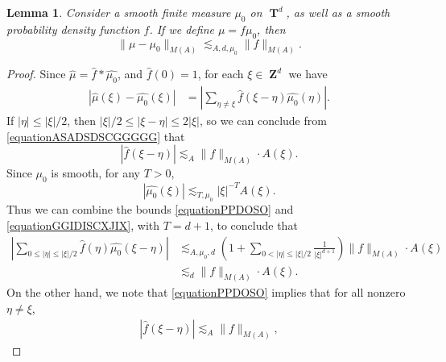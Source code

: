 \documentclass[12pt,reqno]{article}
\numberwithin{equation}{section}
\DeclareMathOperator{\ZZ}{\mathbf{Z}}
\DeclareMathOperator{\TT}{\mathbf{T}}
\newtheorem{lemma}[theorem]{Lemma}
\begin{document}
\begin{lemma} \label{LemmaTTSICICS}
    Consider a smooth finite measure $\mu_0$ on $\TT^d$, as well as a smooth probability density function $f$. If we define $\mu = f \mu_0$, then
    \[ \| \mu - \mu_0 \|_{M(A)} \lesssim_{A,d,\mu_0} \| f \|_{M(A)}. \]
\end{lemma}
\begin{proof}
    Since $\widehat{\mu} = \widehat{f} * \widehat{\mu_0}$, and $\widehat{f}(0) = 1$, for each $\xi \in \ZZ^d$ we have
    \begin{equation} \label{equationPPYTUECUUCS}
    \begin{split}
        |\widehat{\mu}(\xi) - \widehat{\mu_0}(\xi)| &= \left| \sum_{\eta \neq \xi} \widehat{f}(\xi - \eta) \widehat{\mu_0}(\eta) \right|.
    \end{split}
    \end{equation}
    If $|\eta| \leq |\xi|/2$, then $|\xi|/2 \leq |\xi - \eta| \leq 2 |\xi|$, so we can conclude from \eqref{equationASADSDSCGGGGG} that
    \begin{equation} \label{equationPPDOSO}
        |\widehat{f}(\xi - \eta)| \lesssim_A \| f \|_{M(A)} \cdot A(\xi).
    \end{equation}
    Since $\mu_0$ is smooth, for any $T > 0$,
    \begin{equation} \label{equationGGIDISCXJIX}
        |\widehat{\mu_0}(\xi)| \lesssim_{T,\mu_0} |\xi|^{-T} A(\xi).
    \end{equation}
    Thus we can combine the bounds \eqref{equationPPDOSO} and \eqref{equationGGIDISCXJIX}, with $T = d+1$, to conclude that
    \begin{equation} \label{equationGGPSOVVCSI}
    \begin{split}
        \left| \sum_{0 \leq |\eta| \leq |\xi|/2} \widehat{f}(\eta) \widehat{\mu_0}(\xi - \eta) \right| &\lesssim_{A,\mu_0,d} \left( 1 + \sum_{0 < |\eta| \leq |\xi|/2} \frac{1}{|\xi|^{d+1}} \right) \| f \|_{M(A)} \cdot A(\xi)\\
        &\lesssim_d \| f \|_{M(A)} \cdot A(\xi).
    \end{split}
    \end{equation}
    On the other hand, we note that \eqref{equationPPDOSO} implies that for all nonzero $\eta \neq \xi$,
    \begin{equation} \label{equationGGDPSOX}
    \begin{split}
        |\widehat{f}(\xi - \eta)| \lesssim_A \| f \|_{M(A)},

\end{split}
\end{equation}
\end{proof}
\end{document}
